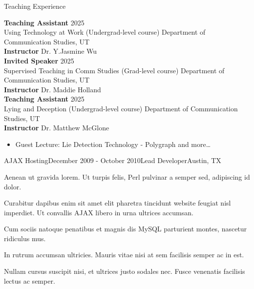 \documentclass[
	11pt, %
]{resume} %
\begin{document}

\begin{rSection}{Teaching Experience}
	
    \textbf{Teaching Assistant} \hfill 2025 \\ 
    Using Technology at Work (Undergrad-level course) \hfill Department of Communication Studies, UT \\
    \textbf{Instructor} Dr. Y.Jasmine Wu\\

    \textbf{Invited Speaker} \hfill 2025 \\ 
    Supervised Teaching in Comm Studies (Grad-level course) \hfill Department of Communication Studies, UT \\
    \textbf{Instructor} Dr. Maddie Holland\\

    \textbf{Teaching Assistant} \hfill 2025 \\ 
    Lying and Deception (Undergrad-level course) \hfill Department of Communication Studies, UT \\
    \textbf{Instructor} Dr. Matthew McGlone\\
\vspace{-5pt}
\begin{itemize}
  \item Guest Lecture: Lie Detection Technology - Polygraph and more… \\
\end{itemize}
	
\end{rSection}


	\begin{rSubsection}{AJAX Hosting}{December 2009 - October 2010}{Lead Developer}{Austin, TX}
		\item Aenean ut gravida lorem. Ut turpis felis, Perl pulvinar a semper sed, adipiscing id dolor.
		\item Curabitur dapibus enim sit amet elit pharetra tincidunt website feugiat nisl imperdiet. Ut convallis AJAX libero in urna ultrices accumsan.
		\item Cum sociis natoque penatibus et magnis dis MySQL parturient montes, nascetur ridiculus mus.
		\item In rutrum accumsan ultricies. Mauris vitae nisi at sem facilisis semper ac in est.
		\item Nullam cursus suscipit nisi, et ultrices justo sodales nec. Fusce venenatis facilisis lectus ac semper.
	\end{rSubsection}
\end{document}
